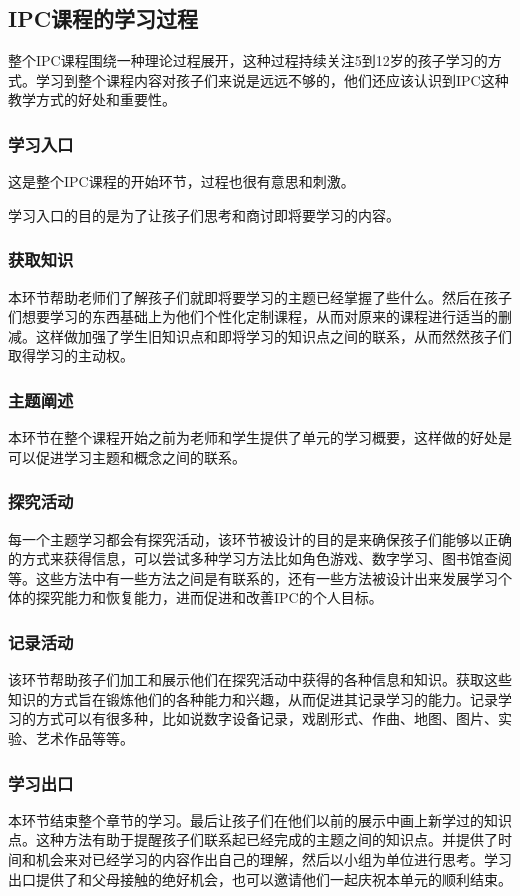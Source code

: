 \subsection{IPC课程的学习过程}
     整个IPC课程围绕一种理论过程展开，这种过程持续关注5到12岁的孩子学习的方式。学习到整个课程内容对孩子们来说是远远不够的，他们还应该认识到IPC这种教学方式的好处和重要性。 \par
     

\subsubsection{学习入口}
    这是整个IPC课程的开始环节，过程也很有意思和刺激。 \par
    学习入口的目的是为了让孩子们思考和商讨即将要学习的内容。

\subsubsection{获取知识}
    本环节帮助老师们了解孩子们就即将要学习的主题已经掌握了些什么。然后在孩子们想要学习的东西基础上为他们个性化定制课程，从而对原来的课程进行适当的删减。这样做加强了学生旧知识点和即将学习的知识点之间的联系，从而然然孩子们取得学习的主动权。\par

\subsubsection{主题阐述}
    本环节在整个课程开始之前为老师和学生提供了单元的学习概要，这样做的好处是可以促进学习主题和概念之间的联系。\par

\subsubsection{探究活动}
    每一个主题学习都会有探究活动，该环节被设计的目的是来确保孩子们能够以正确的方式来获得信息，可以尝试多种学习方法比如角色游戏、数字学习、图书馆查阅等。这些方法中有一些方法之间是有联系的，还有一些方法被设计出来发展学习个体的探究能力和恢复能力，进而促进和改善IPC的个人目标。

\subsubsection{记录活动}
    该环节帮助孩子们加工和展示他们在探究活动中获得的各种信息和知识。获取这些知识的方式旨在锻炼他们的各种能力和兴趣，从而促进其记录学习的能力。记录学习的方式可以有很多种，比如说数字设备记录，戏剧形式、作曲、地图、图片、实验、艺术作品等等。

\subsubsection{学习出口}
    本环节结束整个章节的学习。最后让孩子们在他们以前的展示中画上新学过的知识点。这种方法有助于提醒孩子们联系起已经完成的主题之间的知识点。并提供了时间和机会来对已经学习的内容作出自己的理解，然后以小组为单位进行思考。学习出口提供了和父母接触的绝好机会，也可以邀请他们一起庆祝本单元的顺利结束。
